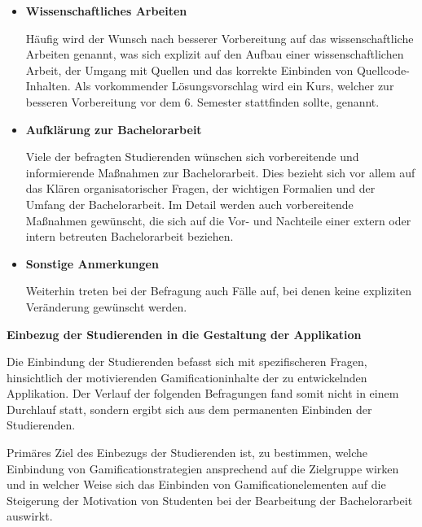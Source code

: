 \documentclass{scrreprt}
\begin{document}
\begin{itemize}
\begin{itemize}
\item \textbf{Wissenschaftliches Arbeiten}
\par Häufig wird der Wunsch nach besserer Vorbereitung auf das wissenschaftliche Arbeiten genannt, was sich explizit auf den Aufbau einer wissenschaftlichen Arbeit, der Umgang mit Quellen und das korrekte Einbinden von Quellcode-Inhalten. Als vorkommender Lösungsvorschlag wird ein Kurs, welcher zur besseren Vorbereitung vor dem 6. Semester stattfinden sollte, genannt.\\

\item \textbf{Aufklärung zur Bachelorarbeit}
\par Viele der befragten Studierenden wünschen sich vorbereitende und informierende Maßnahmen zur Bachelorarbeit. Dies bezieht sich vor allem auf das Klären organisatorischer Fragen, der wichtigen Formalien und der Umfang der Bachelorarbeit. Im Detail werden auch vorbereitende Maßnahmen gewünscht, die sich auf die Vor- und Nachteile einer extern oder intern betreuten Bachelorarbeit beziehen.\\ 

\item \textbf{Sonstige Anmerkungen}
\par Weiterhin treten bei der Befragung auch Fälle auf, bei denen keine expliziten Veränderung gewünscht werden.\\

\end{itemize}

\end{itemize}

\newpage
\par \textbf{Einbezug der Studierenden in die Gestaltung der Applikation}\\
\par Die Einbindung der Studierenden befasst sich mit spezifischeren Fragen, hinsichtlich der motivierenden Gamificationinhalte der zu entwickelnden Applikation. Der Verlauf der folgenden Befragungen fand somit nicht in einem Durchlauf statt, sondern ergibt sich aus dem permanenten Einbinden der Studierenden.

\par Primäres Ziel des Einbezugs der Studierenden ist, zu bestimmen, welche Einbindung von Gamificationstrategien ansprechend auf die Zielgruppe wirken und in welcher Weise sich das Einbinden von Gamificationelementen auf die Steigerung der Motivation von Studenten bei der Bearbeitung der Bachelorarbeit auswirkt.\\
\end{document}
